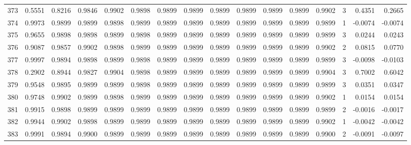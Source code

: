 \begin{tabular}{lrrrrrrrrrrrrrrr}
373 &      0.5551 &  0.8216 &  0.9846 &  0.9902 &  0.9898 &  0.9899 &  0.9899 &  0.9899 &  0.9899 &  0.9899 &   0.9899 &     0.9902 &      3 &                    0.4351 &                     0.2665 \\
374 &      0.9973 &  0.9899 &  0.9899 &  0.9898 &  0.9899 &  0.9899 &  0.9899 &  0.9899 &  0.9899 &  0.9899 &   0.9899 &     0.9899 &      1 &                   -0.0074 &                    -0.0074 \\
375 &      0.9655 &  0.9898 &  0.9898 &  0.9899 &  0.9898 &  0.9899 &  0.9899 &  0.9899 &  0.9899 &  0.9899 &   0.9899 &     0.9899 &      3 &                    0.0244 &                     0.0243 \\
376 &      0.9087 &  0.9857 &  0.9902 &  0.9898 &  0.9899 &  0.9899 &  0.9899 &  0.9899 &  0.9899 &  0.9899 &   0.9899 &     0.9902 &      2 &                    0.0815 &                     0.0770 \\
377 &      0.9997 &  0.9894 &  0.9898 &  0.9899 &  0.9898 &  0.9899 &  0.9899 &  0.9899 &  0.9899 &  0.9899 &   0.9899 &     0.9899 &      3 &                   -0.0098 &                    -0.0103 \\
378 &      0.2902 &  0.8944 &  0.9827 &  0.9904 &  0.9898 &  0.9899 &  0.9899 &  0.9899 &  0.9899 &  0.9899 &   0.9899 &     0.9904 &      3 &                    0.7002 &                     0.6042 \\
379 &      0.9548 &  0.9895 &  0.9899 &  0.9899 &  0.9898 &  0.9899 &  0.9899 &  0.9899 &  0.9899 &  0.9899 &   0.9899 &     0.9899 &      3 &                    0.0351 &                     0.0347 \\
380 &      0.9748 &  0.9902 &  0.9899 &  0.9898 &  0.9899 &  0.9899 &  0.9899 &  0.9899 &  0.9899 &  0.9899 &   0.9899 &     0.9902 &      1 &                    0.0154 &                     0.0154 \\
381 &      0.9915 &  0.9898 &  0.9899 &  0.9899 &  0.9899 &  0.9899 &  0.9899 &  0.9899 &  0.9899 &  0.9899 &   0.9899 &     0.9899 &      2 &                   -0.0016 &                    -0.0017 \\
382 &      0.9944 &  0.9902 &  0.9898 &  0.9899 &  0.9899 &  0.9899 &  0.9899 &  0.9899 &  0.9899 &  0.9899 &   0.9899 &     0.9902 &      1 &                   -0.0042 &                    -0.0042 \\
383 &      0.9991 &  0.9894 &  0.9900 &  0.9899 &  0.9899 &  0.9899 &  0.9899 &  0.9899 &  0.9899 &  0.9899 &   0.9899 &     0.9900 &      2 &                   -0.0091 &                    -0.0097 \\

\end{tabular}
